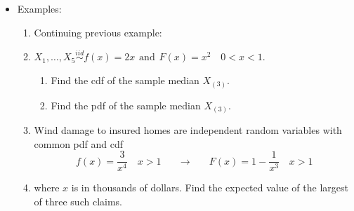 \documentclass{article}
\newcommand{\vecn}[2]{#1_1, \ldots, #1_{#2}}	%
\newcommand{\order}[2]{#1_{(#2)}}		%
\begin{document}
\begin{itemize}
\begin{itemize}
\[\begin{array}{lll}
        \end{array}
        \right.\]
        \item[] $\displaystyle P(R > x) \approx $
        \item Simulation is a very powerful tool that allows researchers to study things that don't have theoretical solutions.
    \end{itemize}\bigskip
    \item Examples:
    \begin{enumerate}
        \item Continuing previous example:
        \item[] $\vecn{X}{5} \overset{iid}\sim f(x) = 2x \hspace{5pt} \text{and} \hspace{5pt} F(x) = x^2 \quad 0 < x < 1$.
        \begin{enumerate}
            \item Find the cdf of the sample median $\order{X}{3}$.\vspace{200pt}
            \item Find the pdf of the sample median $\order{X}{3}$.\vspace{200pt}
        \end{enumerate}\newpage
        \item Wind damage to insured homes are independent random variables with common pdf and cdf
        \[f(x) = \frac{3}{x^4} \quad x > 1 \hspace{20pt} \longrightarrow \hspace{20pt} F(x) = 1 - \frac{1}{x^3} \quad x > 1\]
        \item[] where $x$ is in thousands of dollars. Find the expected value of the largest of three such claims.\vspace{200pt}
    \end{enumerate}
\end{itemize}\bigskip
\end{document}
